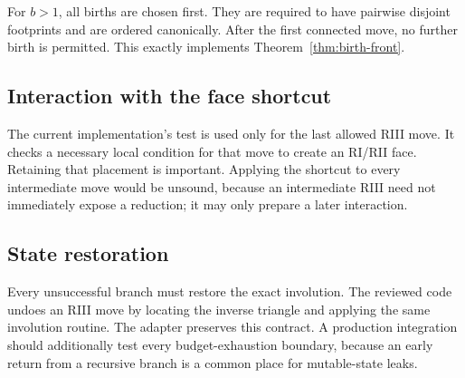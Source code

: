 For $b>1$, all births are chosen first.  They are required to have pairwise
disjoint footprints and are ordered canonically.  After the first connected
move, no further birth is permitted.  This exactly implements
Theorem~\ref{thm:birth-front}.

\subsection{Interaction with the face shortcut}

The current implementation's  test is used only for the
last allowed RIII move.  It checks a necessary local condition for that move to
create an RI/RII face.  Retaining that placement is important.  Applying the
shortcut to every intermediate move would be unsound, because an intermediate
RIII need not immediately expose a reduction; it may only prepare a later
interaction.

\subsection{State restoration}

Every unsuccessful branch must restore the exact involution.  The reviewed code
undoes an RIII move by locating the inverse triangle and applying the same
involution routine.  The adapter preserves this contract.  A production
integration should additionally test every budget-exhaustion boundary, because
an early return from a recursive branch is a common place for mutable-state
leaks.
